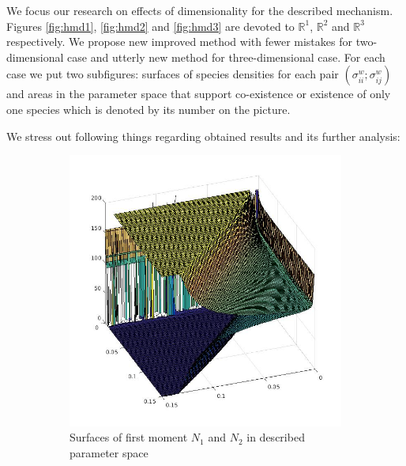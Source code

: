 \documentclass[%
 aip,
rsi,%
 amsmath,amssymb,
 reprint,%
]{revtex4-1}
\begin{document}
We focus our research on effects of dimensionality for the described mechanism. Figures \ref{fig:hmd1}, \ref{fig:hmd2} and \ref{fig:hmd3} are devoted to $\mathbb{R}^1$, $\mathbb{R}^2$ and $\mathbb{R}^3$ respectively. We propose new improved method with fewer mistakes for two-dimensional
case and utterly new method for three-dimensional case. For each case we put two subfigures: surfaces of species densities for each pair \( (\sigma^w_{ii}; \sigma^w_{ij}) \) and areas in the parameter space that support co-existence or existence of only one species which is denoted by its number on the picture.

We stress out following things regarding obtained results and its further analysis:

\begin{figure}[ht]
	\centering
	\begin{subfigure}{.5\textwidth}
		\centering
		\includegraphics[width=.93\linewidth]{N1N2hm08D1.jpg}
		\caption{Surfaces of first moment \(N_1\) and \(N_2\) in described parameter space}
		\label{fig:hmd1:sub1}
	\end{subfigure}%
	\begin{subfigure}{.5\textwidth}
		\centering

\end{subfigure}
\end{figure}
\end{document}
